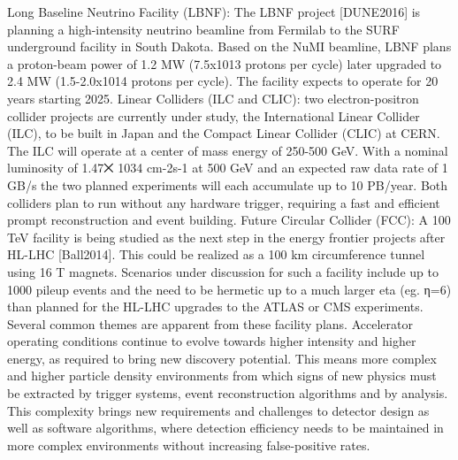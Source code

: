 Long Baseline Neutrino Facility (LBNF): The LBNF project [DUNE2016] is planning a high-intensity neutrino beamline from Fermilab to the SURF underground facility in South Dakota. Based on the NuMI beamline, LBNF plans a proton-beam power of 1.2 MW (7.5x1013 protons per cycle) later upgraded to 2.4 MW (1.5-2.0x1014 protons per cycle). The facility expects to operate for 20 years starting 2025.
Linear Colliders (ILC and CLIC): two electron-positron collider projects are currently under study, the International Linear Collider (ILC), to be built in Japan and the Compact Linear Collider (CLIC) at CERN. The ILC will operate at a center of mass energy of 250-500 GeV. With a nominal luminosity of 1.47⨉ 1034 cm-2s-1 at 500 GeV and an expected raw data rate of 1 GB/s the two planned experiments will each accumulate up to 10 PB/year. Both colliders plan to run without any hardware trigger, requiring a fast and efficient prompt reconstruction and event building.
Future Circular Collider (FCC): A 100 TeV facility is being studied as the next step in the energy frontier projects after HL-LHC [Ball2014]. This could be realized as a 100 km circumference tunnel using 16 T magnets. Scenarios under discussion for such a facility include up to 1000 pileup events and the need to be hermetic up to a much larger eta (eg. η=6) than planned for the HL-LHC upgrades to the ATLAS or CMS experiments. 
Several common themes are apparent from these facility plans. Accelerator operating conditions continue to evolve towards higher intensity and higher energy, as required to bring new discovery potential. This means more complex and higher particle density environments from which signs of new physics must be extracted by trigger systems, event reconstruction algorithms and by analysis. This complexity brings new requirements and challenges to detector design as well as software algorithms, where detection efficiency needs to be maintained in more complex environments without increasing false-positive rates. 

